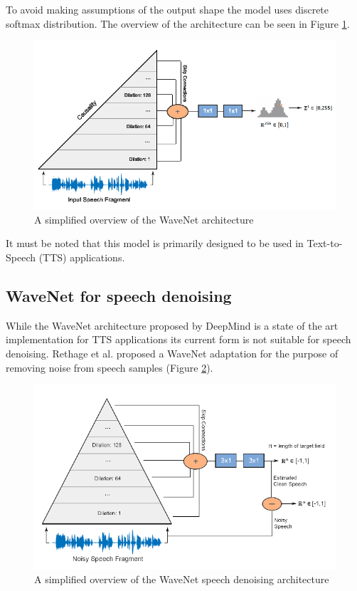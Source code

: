 \documentclass{article}
\begin{document}
	To avoid making assumptions of the output shape the model uses discrete softmax distribution. The overview of the architecture can be seen in Figure \ref{fig:wavenet}.

	\begin{figure}[H]
		\centering
		\includegraphics[width=.8\linewidth]{wavenet_overview.png}
		\caption{A simplified overview of the WaveNet architecture}
		\label{fig:wavenet}
	\end{figure}
	It must be noted that this model is primarily designed to be used in Text-to-Speech (TTS) applications.
	
	\subsection{WaveNet for speech denoising}
	While the WaveNet architecture proposed by DeepMind is a state of the art implementation for TTS applications its current form is not suitable for speech denoising.
	Rethage et al. \cite{rethage2018wavenet} proposed a WaveNet adaptation for the purpose of removing noise from speech samples (Figure \ref{fig:wavenet2}).
	
	\begin{figure}[H]
		\centering
		\includegraphics[width=.8\linewidth]{wavenet_overview2.png}
		\caption{A simplified overview of the WaveNet speech denoising architecture}
		\label{fig:wavenet2}
	\end{figure}
	
\end{document}
